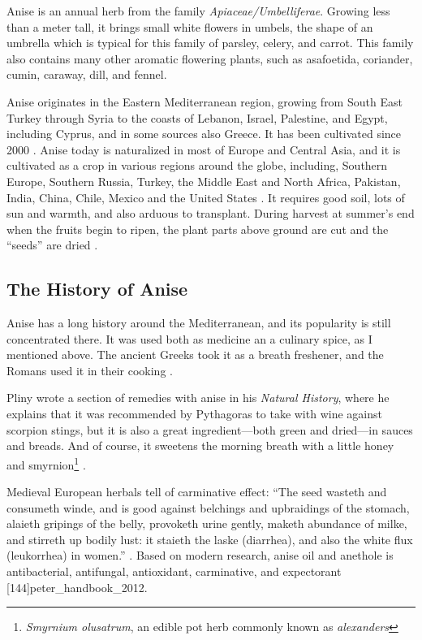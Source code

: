 Anise is an annual herb from the family \textit{Apiaceae/Umbelliferae}. Growing less than a meter tall, it brings small white flowers in umbels, the shape of an umbrella which is typical for this family of parsley, celery, and carrot. This family also contains many other aromatic flowering plants, such as asa\-foetida, coriander, cumin, caraway, dill, and fennel.

Anise originates in the Eastern Mediterranean region, growing from South East Turkey through Syria to the coasts of Lebanon, Israel, Palestine, and Egypt, including Cyprus, and in some sources also Greece. It has been cultivated since 2000 \BC{} \autocite[718]{mabberley_mabberleys_2017}.
Anise today is naturalized in most of Europe and Central Asia, and it is cultivated as a crop in various regions around the globe, including, Southern Europe, Southern Russia, Turkey, the Middle East and North Africa, Pakistan, India, China, Chile, Mexico and the United States \autocite[32]{farrell_spices_1985}. It requires good soil, lots of sun and warmth, and also arduous to transplant. During harvest at summer's end when the fruits begin to ripen, the plant parts above ground are cut and the ``seeds'' are dried \autocite[212]{van_wyk_culinary_2014}.

\subsection{The History of Anise}

Anise has a long history around the Mediterranean, and its popularity is still concentrated there. It was used both as medicine an a culinary spice, as I mentioned above. The ancient Greeks took it as a breath freshener, and the Romans used it in their cooking \autocite{farrell_spices_1985}.

Pliny wrote a section of remedies with anise in his \textit{Natural History}, where he explains that it was recommended by Pythagoras to take with wine against scorpion stings, but it is also a great ingredient---both green and dried---in sauces and breads. And of course, it sweetens the morning breath with a little honey and smyrnion\footnote{\textit{Smyrnium olusatrum}, an edible pot herb commonly known as \textit{alexanders}} \autocite[20:72 ]{pliny_the_elder_natural_1855}.

Medieval European herbals tell of carminative effect: ``The seed wasteth and consumeth winde, and is good against belchings and upbraidings of the stomach, alaieth gripings of the belly, provoketh urine gently, maketh abundance of milke, and stirreth up bodily lust: it staieth the laske (diarrhea), and also the white flux (leukorrhea) in women.'' \autocite[880 ]{gerarde_herball_1597}. Based on modern research, anise oil and anethole is antibacterial, antifungal, antioxidant, carminative, and expectorant [144]{peter_handbook_2012}.

